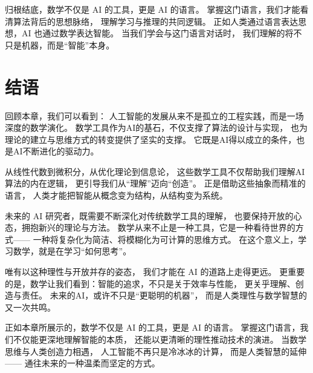 归根结底，数学不仅是 AI 的工具，更是 AI 的语言。  
掌握这门语言，我们才能看清算法背后的思想脉络，  
理解学习与推理的共同逻辑。  
正如人类通过语言表达思想，AI 也通过数学表达智能。  
当我们学会与这门语言对话时，  
我们理解的将不只是机器，而是“智能”本身。

\section{结语}

回顾本章，我们可以看到：  
人工智能的发展从来不是孤立的工程实践，而是一场深度的数学演化。  
数学工具作为AI的基石，不仅支撑了算法的设计与实现，  
也为理论的建立与思维方式的转变提供了坚实的支撑。  
它既是AI得以成立的条件，也是AI不断进化的驱动力。

从线性代数到微积分，从优化理论到信息论，  
这些数学工具不仅帮助我们理解AI算法的内在逻辑，  
更引导我们从“理解”迈向“创造”。  
正是借助这些抽象而精准的语言，  
人类才能把智能从概念变为结构，从结构变为系统。

未来的 AI 研究者，既需要不断深化对传统数学工具的理解，  
也要保持开放的心态，拥抱新兴的理论与方法。  
数学从来不止是一种工具，它是一种看待世界的方式——  
一种将复杂化为简洁、将模糊化为可计算的思维方式。  
在这个意义上，学习数学，就是在学习“如何思考”。

唯有以这种理性与开放并存的姿态，  
我们才能在 AI 的道路上走得更远。  
更重要的是，数学让我们看到：智能的追求，不只是关于效率与性能，  
更关乎理解、创造与责任。  
未来的AI，或许不只是“更聪明的机器”，  
而是人类理性与数学智慧的又一次共鸣。

正如本章所展示的，数学不仅是 AI 的工具，更是 AI 的语言。  
掌握这门语言，我们不仅能更深地理解智能的本质，  
还能以更清晰的理性推动技术的演进。  
当数学思维与人类创造力相遇，  
人工智能不再只是冷冰冰的计算，  
而是人类智慧的延伸——  
通往未来的一种温柔而坚定的方式。

\nocite{*}
